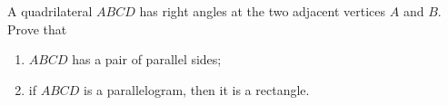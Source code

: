 A quadrilateral $ABCD$ has right angles at the two adjacent vertices $A$ and $B$. Prove that
\begin{enumerate}
\item[(a)] $ABCD$ has a pair of parallel sides;
\item[(b)] if $ABCD$ is a parallelogram, then it is a rectangle.
\end{enumerate}
